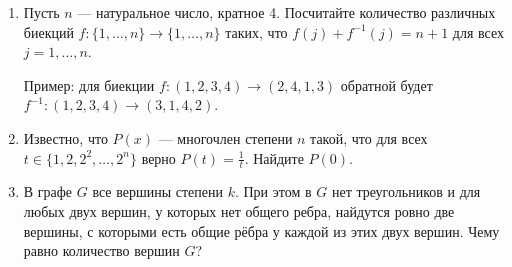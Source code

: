 \documentclass[11pt, a4paper]{article}
\begin{document}
\begin{enumerate}
\item Пусть $n$ --- натуральное число, кратное 4. Посчитайте количество различных биекций $f: \{1, \hdots, n\} \rightarrow \{1, \hdots, n\}$ таких, что $f(j) + f^{-1}(j) = n + 1$ для всех $j = 1, \hdots, n$. 

Пример: для биекции $f: (1, 2, 3, 4) \rightarrow (2, 4, 1, 3)$ обратной будет $f^{-1}: (1,2,3,4) \rightarrow (3, 1, 4, 2)$.

\item Известно, что $P(x)$ --- многочлен степени $n$ такой, что для всех $t \in \{ 1, 2, 2^2, \hdots, 2^n \}$ верно $P(t) = \frac{1}{t}$. Найдите $P(0)$.

\item В графе $G$ все вершины степени $k$. При этом в $G$ нет треугольников и для любых двух вершин, у которых нет общего ребра, найдутся ровно две вершины, с которыми есть общие рёбра у каждой из этих двух вершин. Чему равно количество вершин $G$?

\end{enumerate}
\end{document}
